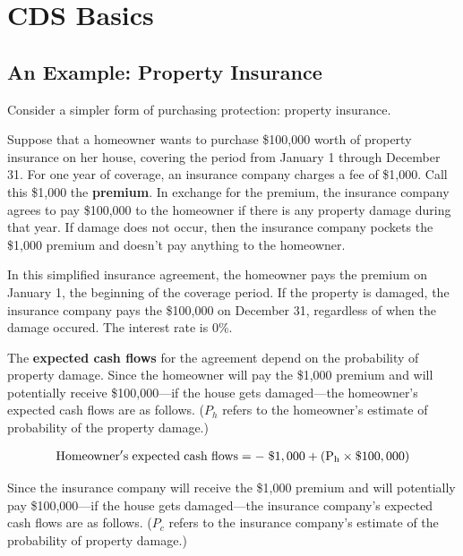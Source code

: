 \documentclass{jss}
\begin{document}
\section{CDS Basics}
\label{sec:CDSBasics}

\subsection{An Example: Property Insurance}
\label{sec:PropInsurance}


Consider a simpler form of purchasing protection: property insurance. 

Suppose that a homeowner wants to purchase \$100,000 worth of property insurance on her house, covering the period from January 1 through December 31. For one year of coverage, an insurance company charges a fee of \$1,000. Call this \$1,000 the \textbf{premium}. In exchange for the premium, the insurance company agrees to pay \$100,000 to the homeowner if there is any property damage during that year. If damage does not occur, then the insurance company pockets the \$1,000 premium and doesn't pay anything to the homeowner. 

In this simplified insurance agreement, the homeowner pays the premium on January 1, the beginning of the coverage period. If the property is damaged, the insurance company pays the \$100,000 on December 31, regardless of when the damage occured. The interest rate is 0\%.

The \textbf{expected cash flows} for the agreement depend on the probability of property damage. Since the homeowner will pay the \$1,000 premium and will potentially receive \$100,000---if the house gets damaged---the homeowner's expected cash flows are as follows. ($P_h$ refers to the homeowner's estimate of probability of the property damage.)

\begin{equation}
 \begin{aligned}
   {\rm Homeowner's\hspace{3pt}expected\hspace{3pt}cash\hspace{3pt}flows = -\hspace{3pt}\$1,000 + (P_h \times {\$100,000})}
    \end{aligned}
    \label{eqn:homeownerECF}
\end{equation}

Since the insurance company will receive the \$1,000 premium and will potentially pay \$100,000---if the house gets damaged---the insurance company's expected cash flows are as follows. ($P_c$ refers to the insurance company's estimate of the probability of property damage.)
\end{document}
